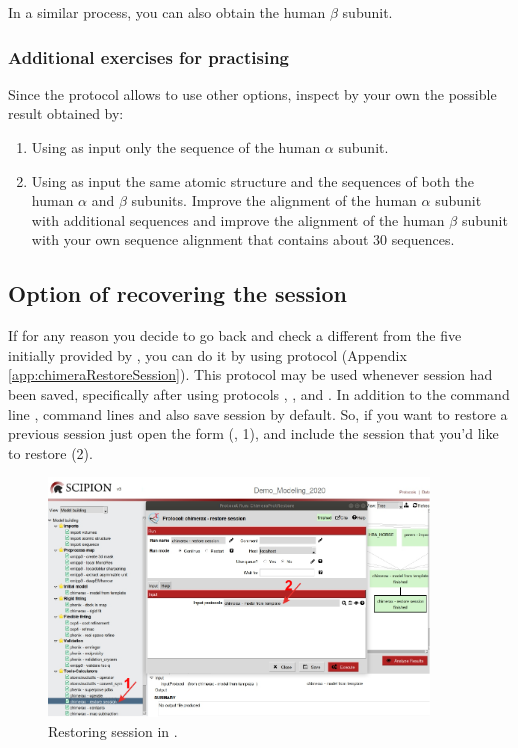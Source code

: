 In a similar process, you can also obtain the human  $\beta$ subunit.\\

\subsubsection*{Additional exercises for practising}
Since the protocol  allows to use other options, inspect by your own the possible result obtained by:\\
\begin{enumerate}
 \item Using as input only the  sequence of the human  $\alpha$ subunit.
 \item Using as input the same atomic structure  and the  sequences of both the human  $\alpha$ and $\beta$ subunits. Improve the alignment of the human  $\alpha$ subunit with additional sequences and improve the alignment of the human  $\beta$ subunit with your own sequence alignment that contains about 30 sequences.
\end{enumerate}


\subsection*{Option of recovering the \chimera session}
If for any reason you decide to go back and check a different  from the five  initially provided by \modeller, you can do it by using  protocol (Appendix \ref{app:chimeraRestoreSession}). This protocol may be used whenever \chimera session had been saved, specifically after using protocols \chimera {}, \chimera {}, \chimera {} and \chimera {}. In addition to the \chimera command line , command lines  and  also save \chimera session by default. So, if you want to restore a previous session just open the form (, 1), and include the session that you'd like to restore (2).

 \begin{figure}[H]
  \centering 
  \captionsetup{width=.7\linewidth} 
  \includegraphics[width=0.90\textwidth]{Images/Fig17}
  \caption{Restoring session in \chimera.}
  \label{fig:restore_session_protocol}
  \end{figure}
